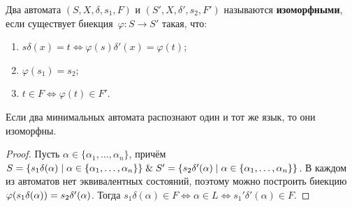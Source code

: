  Два автомата $(S, X, \delta, s_1, F)$ и $(S', X, \delta', s_2, F')$ называются \textbf{изоморфными}, если существует биекция~$\varphi \colon S \to S'$ такая, что:
\begin{enumerate}
	\item $s \delta(x) = t \Leftrightarrow \varphi(s) \delta'(x) = \varphi(t)$;
	\item $\varphi(s_1) = s_2$;
	\item $t \in F \Leftrightarrow \varphi(t) \in F'$.
\end{enumerate}

\begin{statement}
Если два минимальных автомата распознают один и тот же язык, то они изоморфны.
\end{statement}
\begin{proof}
Пусть $\alpha \in \{ \alpha_1, \ldots, \alpha_n \}$, причём $S = \{ s_1 \delta(\alpha) \mid \alpha \in \{ \alpha_1, \ldots, \alpha_n \} \} \opbr\lAnd S' \opbr= \{ s_2 \delta'(\alpha) \mid \alpha \opbr\in \{ \alpha_1, \ldots, \alpha_n \} \}$.
В каждом из автоматов нет эквивалентных состояний, поэтому можно построить биекцию $\varphi(s_1 \delta(\alpha)) \opbr= s_2 \delta'(\alpha)$.
Тогда $s_1 \delta(\alpha) \in F \Leftrightarrow \alpha \in L \Leftrightarrow s_1' \delta'(\alpha) \in F$.
\end{proof}

